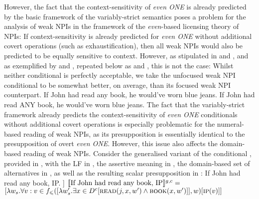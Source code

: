 However, the fact that the context-sensitivity of \textit{even \MakeUppercase{one}} is already predicted by the basic framework of the variably-strict semantics poses a problem for the analysis of weak NPIs in the framework of the \textit{even}-based licensing theory of NPIs: If context-sensitivity is already predicted for \textit{even \MakeUppercase{one}} without additional covert operations (such as exhaustification), then all weak NPIs would also be predicted to be equally sensitive to context. However, as stipulated in  and , and as exemplified by  and , repeated below as  and , this is not the case: Whilst neither conditional is perfectly acceptable, we take the unfocused weak NPI conditional to be somewhat better, on average, than its focused weak NPI counterpart.
\pex
\a \ljudge{\%}If John had read any book, he would've worn blue jeans.
\a\ljudge{\#} If John had read \MakeUppercase{any} book, he would've worn blue jeans.
\xe
The fact that the variably-strict framework already predicts the context-sensitivity of \textit{even \MakeUppercase{one}} conditionals without additional covert operations is especially problematic for the numeral-based reading of weak NPIs, as its presupposition is essentially identical to the presupposition of overt \textit{even \MakeUppercase{one}}. However, this issue also affects the domain-based reading of weak NPIs. Consider the generalised variant of the conditional , provided in , with the LF in , the assertive meaning in , the domain-based set of alternatives in , as well as the resulting scalar presupposition in :
\pex\label{ex:vs-neutral-conditional-any}
\a If John had read any book, IP.
\a[] [even\textsubscript{C} [If John had read any book IP]]
\a $\intension[g,c]{If John had read any book, IP}=$\\$[\lambda w_s.\forall v:v\in f_\leqslant([\lambda w'_s.\exists{x\in{D^c}}[\predicate{read}(j,x,w')\land\predicate{book}(x,w')]],w)[\predicate{ip}(v)]]$
